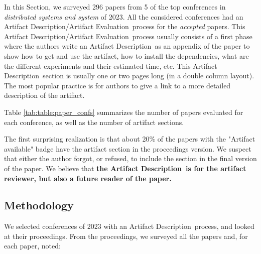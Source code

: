 \documentclass[sigconf,natbib=false]{acmart}
\newcommand{\ad}{Artifact Description}
\newcommand{\aeval}{Artifact Evaluation}
\newcommand{\adae}{\ad/\aeval}
\newcommand{\todo}[1]{{\color{red}{TODO: #1}}}
\begin{document}


In this Section, we surveyed 296 papers from 5 of the top conferences in \emph{distributed systems and system} of 2023.
All the considered conferences had an \adae\ process for the \emph{accepted} papers.
This \adae\ process usually consists of a first phase where the authors write an \ad\ as an appendix of the paper to show how to get and use the artifact, how to install the dependencies, what are the different experiments and their estimated time, etc.
This \ad\ section is usually one or two pages long (in a double column layout).
The most popular practice is for authors to give a link to a more detailed description of the artifact.

Table \ref{tab:table:paper_confs} summarizes the number of papers evaluated for each conference, as well as the number of artifact sections.


The first surprising realization is that about 20\% of the papers with the "Artifact available" badge have the artifact section in the proceedings version.
We suspect that either the author forgot, or refused, to include the section in the final version of the paper.
We believe that \textbf{the \ad\ is for the artifact reviewer, but also a future reader of the paper.}

\subsection{Methodology}

We selected conferences of 2023 with an \ad\ process, and looked at their proceedings.
From the proceedings, we surveyed all the papers and, for each paper, noted:
\end{document}
